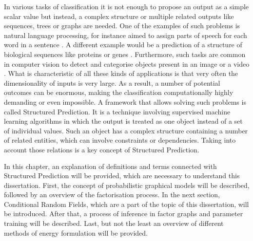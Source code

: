 In various tasks of classification it is not enough to propose an output as a simple scalar value but instead, a complex structure or multiple related outputs like sequences, trees or graphs are needed. One of the examples of such problems is natural language processing, for instance aimed to assign parts of speech for each word in a sentence \cite{markov_altun}. A different example would be a prediction of a structure of biological sequences like proteins or genes \cite{graph_liu}. Furthermore, such tasks are common in computer vision to detect and categorise objects present in an image or a video \cite{crf_torralba}. What is characteristic of all these kinds of applications is that very often the dimensionality of inputs is very large. As a result, a number of potential outcomes can be enormous, making the classification computationally highly demanding or even impossible. A framework that allows solving such problems is called Structured Prediction. It is a technique involving supervised machine learning algorithms in which the output is treated as one object instead of a set of individual values. Such an object has a complex structure containing a number of related entities, which can involve constraints or dependencies. Taking into account those relations is a key concept of Structured Prediction. 

In this chapter, an explanation of definitions and terms connected with Structured Prediction will be provided, which are necessary to understand this dissertation. First, the concept of probabilistic graphical models will be described, followed by an overview of the factorisation process. In the next section, Conditional Random Fields, which are a part of the topic of this dissertation, will be introduced. After that, a process of inference in factor graphs and parameter training will be described. Last, but not the least an overview of different methods of energy formulation will be provided. 